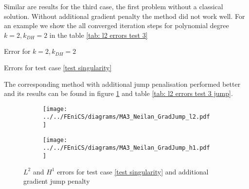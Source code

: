 Similar are results for the third case, the first problem without a classical solution. Without additional gradient penalty the method did not work well. For an example we show the all converged iteration steps for polynomial degree $k=2, k_{DH}=2$ in the table \ref{tab: l2 errors test 3}
\begin{table}[H]
		\centering
		\pgfplotstabletypeset[
		columns={iterations, l2error, h1error,N},
		    every row 0 column 0/.style={set content=init},
		]{\MAThreedegTwoTwo}
    	\caption{Error for $k=2, k_{DH}=2$}
	\caption{Errors for test case \ref{test singularity}}
	\label{tab: l2 errors test 3}
\end{table}

The corresponding method with additional jump penalisation performed better and its results can be found in figure \ref{fig: l2 errors test 3 jump} and table \ref{tab: l2 errors test 3 jump}. 
\begin{figure}[H]
	\centering
	\begin{subfigure}{\textwidth}
		\centering
		\texttt{[image: ../../FEniCS/diagrams/MA3\_Neilan\_GradJump\_l2.pdf]}
	\end{subfigure}
	
	\begin{subfigure}{\textwidth}
		\centering
		\texttt{[image: ../../FEniCS/diagrams/MA3\_Neilan\_GradJump\_h1.pdf]}
	\end{subfigure}
	\caption{$L^2$ and $H^1$ errors for test case \ref{test singularity} and additional gradient jump penalty}
	\label{fig: l2 errors test 3 jump}
\end{figure}

